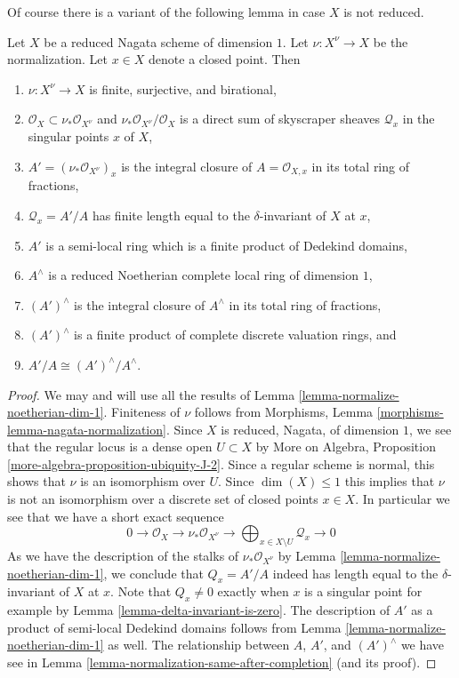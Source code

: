 \noindent
Of course there is a variant of the following lemma in case
$X$ is not reduced.

\begin{lemma}
\label{lemma-prepare-delta-invariant}
Let $X$ be a reduced Nagata scheme of dimension $1$. Let $\nu : X^\nu \to X$
be the normalization. Let $x \in X$ denote a closed point. Then
\begin{enumerate}
\item $\nu : X^\nu \to X$ is finite, surjective, and birational,
\item $\mathcal{O}_X \subset \nu_*\mathcal{O}_{X^\nu}$ and
$\nu_*\mathcal{O}_{X^\nu}/\mathcal{O}_X$ is a direct sum of
skyscraper sheaves $\mathcal{Q}_x$ in the singular points $x$ of $X$,
\item $A' = (\nu_*\mathcal{O}_{X^\nu})_x$ is the integral closure
of $A = \mathcal{O}_{X, x}$ in its total ring of fractions,
\item $\mathcal{Q}_x = A'/A$ has finite length equal to the
$\delta$-invariant of $X$ at $x$,
\item $A'$ is a semi-local ring which is a finite product of
Dedekind domains,
\item $A^\wedge$ is a reduced Noetherian complete
local ring of dimension $1$,
\item $(A')^\wedge$ is the integral closure of $A^\wedge$
in its total ring of fractions,
\item $(A')^\wedge$ is a finite product of
complete discrete valuation rings, and
\item $A'/A \cong (A')^\wedge/A^\wedge$.
\end{enumerate}
\end{lemma}

\begin{proof}
We may and will use all the results of
Lemma \ref{lemma-normalize-noetherian-dim-1}.
Finiteness of $\nu$ follows from
Morphisms, Lemma \ref{morphisms-lemma-nagata-normalization}.
Since $X$ is reduced, Nagata, of dimension $1$, we see that the
regular locus is a dense open $U \subset X$ by
More on Algebra, Proposition \ref{more-algebra-proposition-ubiquity-J-2}.
Since a regular scheme is normal, this shows that $\nu$
is an isomorphism over $U$.
Since $\dim(X) \leq 1$ this implies that $\nu$ is not an isomorphism
over a discrete set of closed points $x \in X$.
In particular we see that we have a short exact sequence
$$
0 \to \mathcal{O}_X \to \nu_*\mathcal{O}_{X^\nu} \to
\bigoplus\nolimits_{x \in X \setminus U} \mathcal{Q}_x \to 0
$$
As we have the description of the stalks of $\nu_*\mathcal{O}_{X^\nu}$
by Lemma \ref{lemma-normalize-noetherian-dim-1}, we conclude that
$Q_x = A'/A$ indeed has length equal to the $\delta$-invariant of $X$ at $x$.
Note that $Q_x \not = 0$ exactly when $x$ is a singular point for
example by Lemma \ref{lemma-delta-invariant-is-zero}.
The description of $A'$ as a product of semi-local Dedekind domains follows
from Lemma \ref{lemma-normalize-noetherian-dim-1} as well.
The relationship between $A$, $A'$, and $(A')^\wedge$
we have see in Lemma \ref{lemma-normalization-same-after-completion}
(and its proof).
\end{proof}




